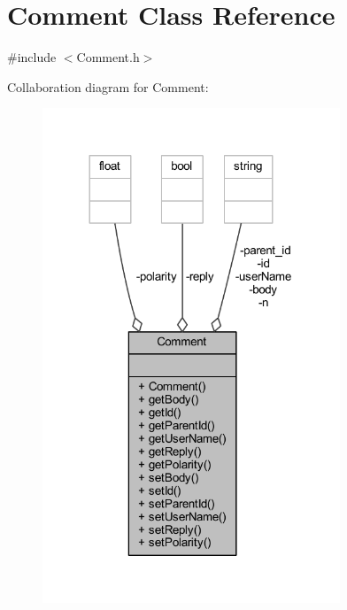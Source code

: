 \hypertarget{class_comment}{}\section{Comment Class Reference}
\label{class_comment}


{\ttfamily \#include $<$Comment.\+h$>$}



Collaboration diagram for Comment\+:\nopagebreak
\begin{figure}[H]
\begin{center}
\leavevmode
\includegraphics[width=252pt]{class_comment__coll__graph}
\end{center}
\end{figure}
